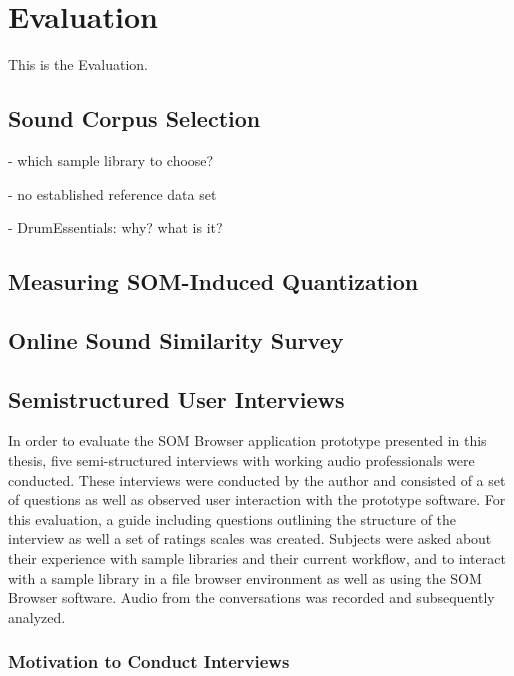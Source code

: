 
\section{Evaluation}
\label{sec:evaluation}
This is the Evaluation.

\subsection{Sound Corpus Selection}
\label{subsec:eval_corpus_selection}
- which sample library to choose?

- no established reference data set

- DrumEssentials: why? what is it?

\subsection{Measuring SOM-Induced Quantization}
\label{subsec:evaluation_tech}

\subsection{Online Sound Similarity Survey}
\label{subsec:evaluation_survey}

\subsection{Semistructured User Interviews}
\label{subsec:evaluation_interviews}

In order to evaluate the SOM Browser application prototype presented in this
thesis, five semi-structured interviews with working audio professionals were
conducted. These interviews were conducted by the author and consisted of a set
of questions as well as observed user interaction with the prototype software.
For this evaluation, a guide including questions outlining the
structure of the interview as well a set of ratings scales was created. Subjects
were asked about their experience with sample libraries and their current
workflow, and to interact with a sample library in a file browser environment as
well as using the SOM Browser software. Audio from the conversations was
recorded and subsequently analyzed.

\subsubsection{Motivation to Conduct Interviews}
\label{subsubsec:interview_motivation}

